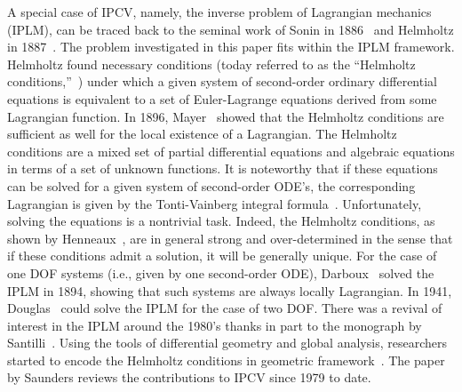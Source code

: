 A special case of IPCV, namely, the inverse problem of Lagrangian
mechanics (IPLM), can be traced back to the seminal work of Sonin in
1886~\cite{sonin1886} and Helmholtz in 1887~\cite{Helmholtz-1887}. The
problem investigated in this paper fits within the IPLM framework.
Helmholtz found necessary conditions (today referred to as the
``Helmholtz conditions,''~\cite{Santilli-1978}) under which a given
system of second-order ordinary differential equations is equivalent
to a set of Euler-Lagrange equations derived from some Lagrangian
function. In 1896, Mayer~\cite{Mayer-1896} showed that the Helmholtz
conditions are sufficient as well for the local existence of a
Lagrangian. The Helmholtz conditions are a mixed set of partial
differential equations and algebraic equations in terms of a set of
unknown functions.  It is noteworthy that if these equations can be
solved for a given system of second-order ODE's, the corresponding
Lagrangian is given by the Tonti-Vainberg integral
formula~\cite{Tonti-1969, Vainberg-1959}. Unfortunately, solving the
equations is a nontrivial task. Indeed, the Helmholtz conditions, as
shown by Henneaux~\cite{Henneaux-1982}, are in general strong and
over-determined in the sense that if these conditions admit a
solution, it will be generally unique. For the case of one DOF systems
(i.e., given by one second-order ODE), Darboux~\cite{Darboux-1894}
solved the IPLM in 1894, showing that such systems are always locally
Lagrangian. In 1941, Douglas~\cite{Douglas-1941} could solve the IPLM
for the case of two DOF.  There was a revival of interest in the IPLM
around the 1980's thanks in part to the monograph by
Santilli~\cite{Santilli-1978}. Using the tools of differential
geometry and global analysis, researchers started to encode the
Helmholtz conditions in geometric framework~\cite{Santilli-1978,
	Tonti-1969, Sarlet-1982,Anderson-1980,Crampin-1981, Crampin-1984,
	Takens-1979,Sarlet-1993,Kru97,Kru15}.  The paper by Saunders
\cite{Saunders-2010} reviews the contributions to IPCV since 1979 to
date.

